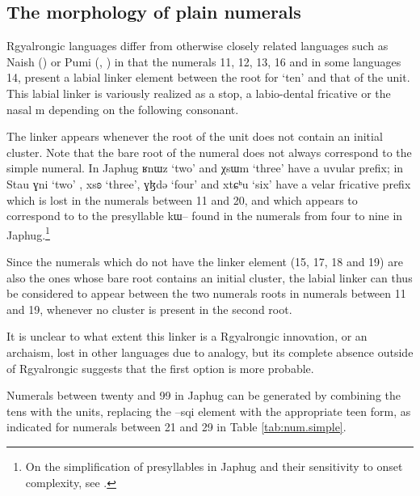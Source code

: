 \documentclass[oldfontcommands,oneside,a4paper,12pt]{article}
\newcommand{\ipa}[1]{{\phon#1}}
\begin{document}
 \subsection{The morphology of plain numerals}
 
 Rgyalrongic languages differ from otherwise closely related languages such as Naish (\citealt{michaud11cl}) or Pumi (\citealt[141]{daudey14grammar}, \citealt[91-2]{ding14grammar}) in that the numerals 11, 12, 13, 16  and in some languages 14, present a labial linker element between the root for `ten' and that of the unit.  
 This labial linker  is variously realized as a stop, a labio-dental fricative or the nasal \ipa{m} depending on the following consonant.
 
 The linker appears whenever  the root of the unit does not contain an initial cluster. Note that the bare root of the numeral does not always correspond to the simple numeral. In Japhug \ipa{ʁnɯz}  `two' and 	\ipa{χsɯm} `three'  have a uvular prefix; in Stau \ipa{ɣni} `two' , \ipa{xsʚ} `three', \ipa{ɣɮdə} `four' and 	\ipa{xtɕʰu} `six'  have a velar fricative prefix which is lost in the numerals between 11 and 20, and which appears to correspond  to  to the presyllable \ipa{kɯ--} found in the numerals from four to nine in Japhug.\footnote{On the simplification of presyllables in Japhug and their sensitivity to onset complexity, see \citet{jacques14antipassive}.}
 
Since the numerals which do not have the linker element (15, 17, 18 and 19) are also the ones whose bare root contains an initial cluster, the labial linker can thus be considered to appear between the two numerals roots in numerals between 11 and 19, whenever no cluster is present in the second root.
 
It is unclear to what extent this linker is a Rgyalrongic innovation, or an archaism, lost in other languages due to  analogy, but its complete absence outside of Rgyalrongic suggests that the first option is more probable.


Numerals between  twenty  and 99 in Japhug can be generated by combining the tens with the units, replacing the \ipa{--sqi} element with the appropriate teen form, as indicated for numerals between 21 and 29 in Table \ref{tab:num.simple}.
\end{document}
